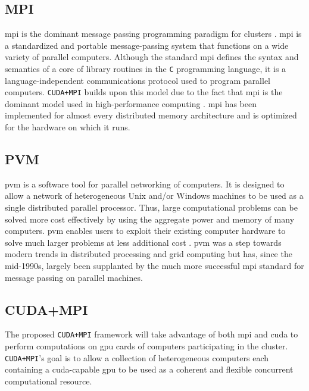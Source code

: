 \subsection{MPI}

\Gls{mpi} is the dominant message passing programming paradigm for clusters
\cite{website:Message-Passing-Interface-Forum}
\cite{website:Message-Passing-Interface}. \gls{mpi} is a standardized and
portable message-passing system that functions on a wide variety of parallel
computers. Although the standard \gls{mpi} defines the syntax and semantics of
a core of library routines in the \texttt{C} programming language, it is a
language-independent communications protocol used to program parallel
computers. \texttt{CUDA+MPI} builds upon this model due to the fact that
\gls{mpi} is the dominant model used in high-performance computing
\cite{sur2006high}. \Gls{mpi} has been implemented for almost every distributed
memory architecture and is optimized for the hardware on which it runs.

\subsection{PVM}

\Gls{pvm} is a software tool for parallel networking of computers. It is
designed to allow a network of heterogeneous Unix and/or Windows machines to be
used as a single distributed parallel processor. Thus, large computational
problems can be solved more cost effectively by using the aggregate power and
memory of many computers. \gls{pvm} enables users to exploit their existing
computer hardware to solve much larger problems at less additional cost
\cite{website:Computer-Science-and-Division}. \gls{pvm} was a step towards
modern trends in distributed processing and grid computing but has, since the
mid-1990s, largely been supplanted by the much more successful \gls{mpi}
standard for message passing on parallel machines.

\subsection{CUDA+MPI}

The proposed \texttt{CUDA+MPI} framework will take advantage of both \gls{mpi}
and \gls{cuda} to perform computations on \gls{gpu} cards of computers
participating in the cluster. \texttt{CUDA+MPI}'s goal is to allow a collection
of heterogeneous computers each containing a \gls{cuda}-capable \gls{gpu} to be
used as a coherent and flexible concurrent computational resource.
